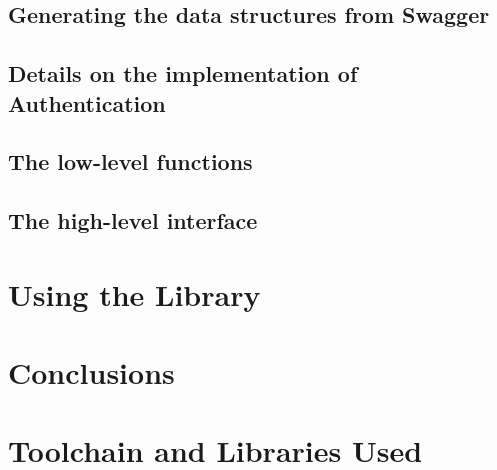 \documentclass[11pt]{report}
\begin{document}
\section{Generating the data structures from Swagger} %

\section{Details on the implementation of Authentication} %

\section{The low-level functions} %

\section{The high-level interface} %


\chapter{Using the Library} %

\chapter{Conclusions} %


\chapter{Toolchain and Libraries Used}
\end{document}
